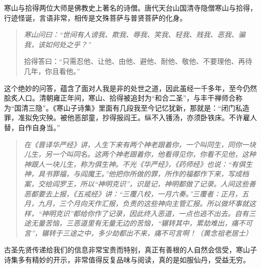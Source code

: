 \begin{book}[《寒山子诗集》]
    寒山与拾得两位大师是佛教史上著名的诗僧。唐代天台山国清寺隐僧寒山与拾得，行迹怪诞，言语非常，相传是文殊菩萨与普贤菩萨的化身。

    \begin{quotation}\it
        寒山问曰：“世间有人谤我、欺我、辱我、笑我、轻我、贱我、恶我、骗我，该如何处之乎？”

        拾得答曰：“只需忍他、让他、由他、避他、耐他、敬他、不要理他、再待几年，你且看他。”
    \end{quotation}

    这个绝妙的问答，蕴含了面对人我是非的处世之道，因此虽经一千多年，至今仍然脍炙人口。清朝雍正年间，寒山、拾得被追封为“和合二圣”，与丰干禅师合称为“国清三隐”。《寒山子诗集》里面有几段我至今记忆犹新，那就是：“闭门私造罪，准拟免灾殃。被他恶部童，抄得报阎王。纵不入镬汤，亦须卧铁床。不许雇人替，自作自身当。”

    \begin{quote}\it
        在《晋译华严经》讲，人生下来有两个神老跟着你，一个叫同生，同你一块儿生，另一个叫同名。这两个神老跟着你，他看得见你，你看不见他，这种神跟人一块儿生，称为俱生神。不光《华严经》，《药师经》也说：“有俱生神，具书罪福，与阎魔王。”他把你所做的罪，所作的福都作下来，写成档案，交给阎罗王，所以“神明克识”，识是记，神明都做了记录。人间这些善恶都要去上报，《五戒经》讲：“三覆八校，一月六奏。”三覆者：正月，五月，九月，三个月向天作汇报，负责的这些神向主管汇报。所以做坏事就这样，“神明克识”都给你作了记录，因此终入恶道，一点也逃不出去。自有三途无量苦恼，三恶道里有无量无边的苦恼，“辗转其中，累劫难出，痛不可言”，辗转于三途之中，多少劫都出不来，痛不可言啊！（黄念祖老居士）
    \end{quote}

    古圣先贤传递给我们的信息非常宝贵而特别，真正有善根的人自然会信受，寒山子诗集多有精妙的开示，非常值得反复品味与阅读，真的是如服仙丹，受益无穷。
\end{book}
